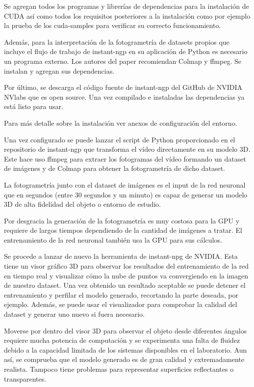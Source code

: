 \documentclass[a4paper, 12pt, spanish, twoside]{article}
\begin{document}
Se agregan todos los programas y librerías de dependencias para la instalación de CUDA así como todos los requisitos posteriores a la instalación como por ejemplo la prueba de los cuda-samples para verificar su correcto funcionamiento. 

Además, para la interpretación de la fotogrametría de datasets propios que incluye el flujo de trabajo de instant-ngp en su aplicación de Python es necesario un programa externo. Los autores del paper recomiendan Colmap y ffmpeg. Se instalan y agregan sus dependencias. 

Por último, se descarga el código fuente de instant-ngp del GitHub de NVIDIA NVlabs que es open source. Una vez compilado e instaladas las dependencias ya está listo para usar. 

Para más detalle sobre la instalación ver anexos de configuración del entorno. 

Una vez configurado se puede lanzar el script de Python proporcionado en el repositorio de instant-ngp que transforma el vídeo directamente en su modelo 3D. Este hace uso ffmpeg para extraer los fotogramas del vídeo formando un dataset de imágenes y de Colmap para obtener la fotogrametría de dicho dataset.  


La fotogrametría junto con el dataset de imágenes es el input de la red neuronal que en segundos (entre 30 segundos y un minuto) es capaz de generar un modelo 3D de alta fidelidad del objeto o entorno de estudio. 


Por desgracia la generación de la fotogrametría es muy costosa para la GPU y requiere de largos tiempos dependiendo de la cantidad de imágenes a tratar. El entrenamiento de la red neuronal también usa la GPU para sus cálculos.

Se procede a lanzar de nuevo la herramienta de instant-npg de NVIDIA. Esta tiene un visor gráfico 3D para observar los resultados del entrenamiento de la red en tiempo real y visualizar cómo la nube de puntos va convergiendo en la imagen de nuestro dataset. Una vez obtenido un resultado aceptable se puede detener el entrenamiento y perfilar el modelo generado, recortando la parte deseada, por ejemplo. Además, se puede usar el visualizador para comprobar la calidad del dataset y generar uno nuevo si fuera necesario.

Moverse por dentro del visor 3D para observar el objeto desde diferentes ángulos requiere mucha potencia de computación y se experimenta una falta de fluidez debido a la capacidad limitada de los sistemas disponibles en el laboratorio. Aun así, se comprueba que el modelo generado es de gran calidad y extremadamente realista. Tampoco tiene problemas para representar superficies reflectantes o transparentes.
\end{document}
